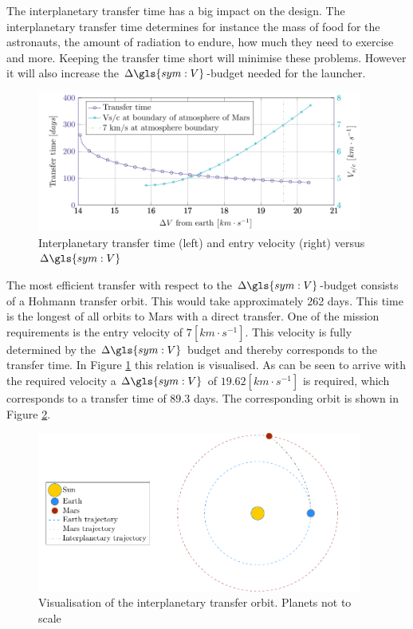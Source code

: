 The interplanetary transfer time has a big impact on the design. The interplanetary transfer time determines for instance the mass of food for the astronauts, the amount of radiation to endure, how much they need to exercise and more. Keeping the transfer time short will minimise these problems. However it will also increase the $\Delta\gls{sym:V}$-budget needed for the launcher. 

\begin{figure}[h]
	\centering
	\includegraphics[width=0.95\textwidth]{Figure/Inter_transfer/transfer_time.pdf}
	\caption[Interplanetary transfer time and entry velocity versus $\Delta\gls{sym:V}$]{Interplanetary transfer time (left) and entry velocity (right) versus $\Delta\gls{sym:V}$}
	\label{fig:inter_time}
\end{figure}

The most efficient transfer with respect to the $\Delta\gls{sym:V}$-budget consists of a Hohmann transfer orbit. This would take approximately 262 days. This time is the longest of all orbits to Mars with a direct transfer. One of the mission requirements is the entry velocity of $7 \left[km \cdot s^{-1}\right]$. This velocity is fully determined by the $\Delta \gls{sym:V}$ budget and thereby corresponds to the transfer time. In Figure \ref{fig:inter_time} this relation is visualised. As can be seen to arrive with the required velocity a $\Delta \gls{sym:V}$ of $19.62 \left[km \cdot s^{-1}\right]$ is required, which corresponds to a transfer time of $89.3$ days. The corresponding orbit is shown in Figure \ref{fig:inter_orbit}.

\begin{figure}[h]
	\centering
	\includegraphics[width=0.95\textwidth]{Figure/Inter_transfer/orbits.pdf}
	\caption[Visualisation of the interplanetary transfer orbit]{Visualisation of the interplanetary transfer orbit. Planets not to scale}
	\label{fig:inter_orbit}
\end{figure}
